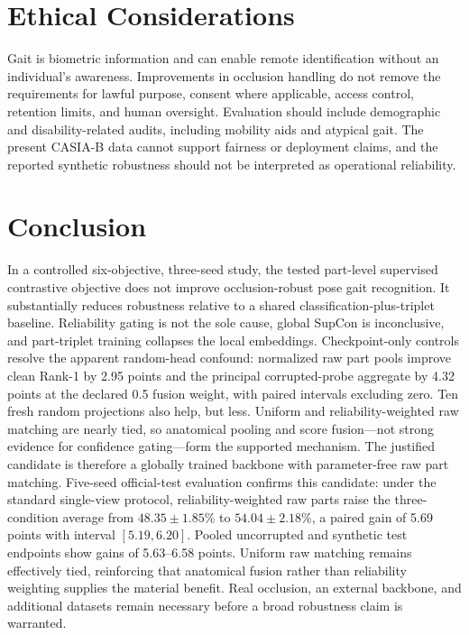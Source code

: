 \documentclass[runningheads]{llncs}
\begin{document}
\section{Ethical Considerations}

Gait is biometric information and can enable remote identification without an
individual's awareness. Improvements in occlusion handling do not remove the
requirements for lawful purpose, consent where applicable, access control,
retention limits, and human oversight. Evaluation should include demographic
and disability-related audits, including mobility aids and atypical gait. The
present CASIA-B data cannot support fairness or deployment claims, and the
reported synthetic robustness should not be interpreted as operational
reliability.

\section{Conclusion}

In a controlled six-objective, three-seed study, the tested part-level
supervised contrastive objective does not improve occlusion-robust pose gait
recognition. It substantially reduces robustness relative to a shared
classification-plus-triplet baseline. Reliability gating is not the sole
cause, global SupCon is inconclusive, and part-triplet training collapses the
local embeddings. Checkpoint-only controls resolve the apparent random-head
confound: normalized raw part pools improve clean Rank-1 by 2.95 points and the
principal corrupted-probe aggregate by 4.32 points at the declared 0.5 fusion
weight, with paired intervals excluding zero. Ten fresh random projections also
help, but less. Uniform and reliability-weighted raw matching are nearly tied,
so anatomical pooling and score fusion---not strong evidence for confidence
gating---form the supported mechanism. The justified candidate is therefore a
globally trained backbone with parameter-free raw part matching. Five-seed
official-test evaluation confirms this candidate: under the standard
single-view protocol, reliability-weighted raw parts raise the three-condition
average from $48.35\pm1.85$\% to $54.04\pm2.18$\%, a paired gain of 5.69 points
with interval $[5.19,6.20]$. Pooled uncorrupted and synthetic test endpoints
show gains of 5.63--6.58 points. Uniform raw matching remains effectively tied,
reinforcing that anatomical fusion rather than reliability weighting supplies
the material benefit. Real occlusion, an external backbone, and additional
datasets remain necessary before a broad robustness claim is warranted.
\end{document}
